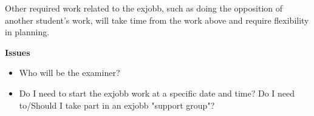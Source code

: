 \documentclass[a4paper,11pt]{kth-mag}
\begin{document}
Other required work related to the exjobb, such as doing the opposition of
another student's work, will take time from the work above and require
flexibility in planning.

\textbf{Issues}

\begin{itemize}
	\item Who will be the examiner?
    \item Do I need to start the exjobb work at a specific date and time? Do I
        need to/Should I take part in an exjobb "support group"?
\end{itemize}
\end{document}
